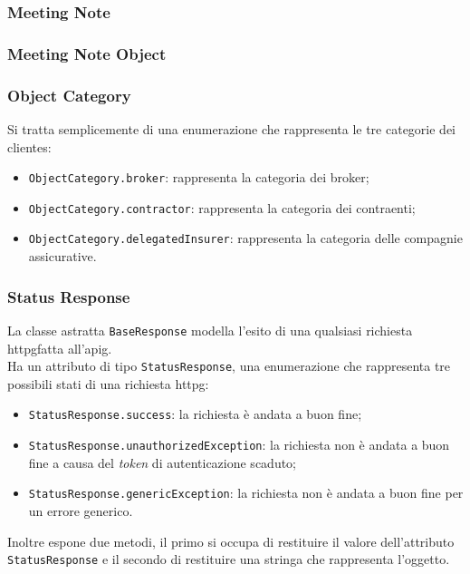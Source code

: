 \subsubsection*{Meeting Note}
\label{subsubsec:meeting-note}

\subsubsection*{Meeting Note Object}
\label{subsubsec:meeting-note-object}

\subsubsection*{Object Category}
\label{subsubsec:object-category}

Si tratta semplicemente di una enumerazione che rappresenta le tre categorie dei \glspl{cliente}\glsoccur:
\begin{itemize}
    \item \lstinline{ObjectCategory.broker}: rappresenta la categoria dei broker;
    \item \lstinline{ObjectCategory.contractor}: rappresenta la categoria dei contraenti;
    \item \lstinline{ObjectCategory.delegatedInsurer}: rappresenta la categoria delle compagnie assicurative.
\end{itemize}

\subsubsection*{Status Response}
\label{subsubsec:status-response}

La classe astratta \lstinline{BaseResponse} modella l'esito di una qualsiasi richiesta \gls{httpg}\glsoccur fatta all'\gls{apig}\glsoccur. \\
Ha un attributo di tipo \lstinline{StatusResponse}, una enumerazione che rappresenta tre possibili stati di una richiesta \gls{httpg}\glsoccur:
\begin{itemize}
    \item \lstinline{StatusResponse.success}: la richiesta è andata a buon fine;
    \item \lstinline{StatusResponse.unauthorizedException}: la richiesta non è andata a buon fine a causa del \emph{token} di autenticazione scaduto;
    \item \lstinline{StatusResponse.genericException}: la richiesta non è andata a buon fine per un errore generico.
\end{itemize}
Inoltre espone due metodi, il primo si occupa di restituire il valore dell'attributo \lstinline{StatusResponse} e il secondo di restituire una stringa che rappresenta l'oggetto.

